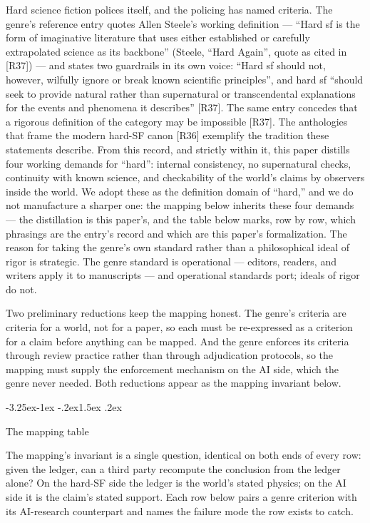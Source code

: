 \documentclass[11pt,a4paper]{article}
\makeatletter
\renewcommand\subsection{\@startsection{subsection}{2}{\z@}%
  {-3.25ex\@plus -1ex \@minus -.2ex}{1.5ex \@plus .2ex}%
  {\normalfont\large\bfseries\raggedright}}
\makeatother
\begin{document}
Hard science fiction polices itself, and the policing has named criteria. The genre's reference entry quotes Allen Steele's working definition — ``Hard sf is the form of imaginative literature that uses either established or carefully extrapolated science as its backbone'' (Steele, ``Hard Again'', quote as cited in [R37]) — and states two guardrails in its own voice: ``Hard sf should not, however, wilfully ignore or break known scientific principles'', and hard sf ``should seek to provide natural rather than supernatural or transcendental explanations for the events and phenomena it describes'' [R37]. The same entry concedes that a rigorous definition of the category may be impossible [R37]. The anthologies that frame the modern hard-SF canon [R36] exemplify the tradition these statements describe. From this record, and strictly within it, this paper distills four working demands for ``hard'': internal consistency, no supernatural checks, continuity with known science, and checkability of the world's claims by observers inside the world. We adopt these as the definition domain of ``hard,'' and we do not manufacture a sharper one: the mapping below inherits these four demands — the distillation is this paper's, and the table below marks, row by row, which phrasings are the entry's record and which are this paper's formalization. The reason for taking the genre's own standard rather than a philosophical ideal of rigor is strategic. The genre standard is operational — editors, readers, and writers apply it to manuscripts — and operational standards port; ideals of rigor do not.

Two preliminary reductions keep the mapping honest. The genre's criteria are criteria for a world, not for a paper, so each must be re-expressed as a criterion for a claim before anything can be mapped. And the genre enforces its criteria through review practice rather than through adjudication protocols, so the mapping must supply the enforcement mechanism on the AI side, which the genre never needed. Both reductions appear as the mapping invariant below.

\subsection{The mapping table}

The mapping's invariant is a single question, identical on both ends of every row: given the ledger, can a third party recompute the conclusion from the ledger alone? On the hard-SF side the ledger is the world's stated physics; on the AI side it is the claim's stated support. Each row below pairs a genre criterion with its AI-research counterpart and names the failure mode the row exists to catch.
\end{document}
